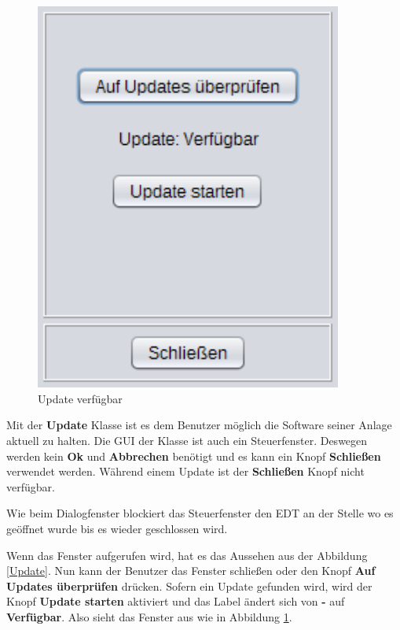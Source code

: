 \begin{figure}[H]
\begin{minipage}[hbt]{0.45\textwidth}
    \includegraphics[width=0.9\textwidth]{Bilder/GUI/Update2}
  	\caption{Update verfügbar}
  	\label{Update2}
  \end{minipage}
  \vspace{0pt}
\end{figure}
Mit der \textbf{Update} Klasse ist es dem Benutzer möglich die Software seiner Anlage aktuell zu halten. Die \ac{GUI} der Klasse ist auch ein Steuerfenster. Deswegen werden kein \textbf{Ok} und \textbf{Abbrechen} benötigt und es kann ein Knopf \textbf{Schließen} verwendet werden. Während einem Update ist der \textbf{Schließen} Knopf nicht verfügbar.

\vspace{10pt}

Wie beim Dialogfenster blockiert das Steuerfenster den \ac{EDT} an der Stelle wo es geöffnet wurde bis es wieder geschlossen wird.

\vspace{10pt}

Wenn das Fenster aufgerufen wird, hat es das Aussehen aus der Abbildung \ref{Update}. Nun kann der Benutzer das Fenster schließen oder den Knopf \textbf{Auf Updates überprüfen} drücken. Sofern ein Update gefunden wird, wird der Knopf \textbf{Update starten} aktiviert und das Label ändert sich von \textbf{-} auf \textbf{Verfügbar}. Also sieht das Fenster aus wie in Abbildung \ref{Update2}.

